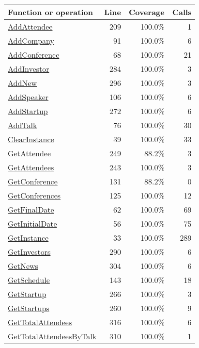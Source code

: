 \begin{longtable}{|l|r|r|r|}
\hline
Function or operation & Line & Coverage & Calls \\
\hline
\hline
\hyperref[AddAttendee:209]{AddAttendee} & 209&100.0\% & 1 \\
\hline
\hyperref[AddCompany:91]{AddCompany} & 91&100.0\% & 6 \\
\hline
\hyperref[AddConference:68]{AddConference} & 68&100.0\% & 21 \\
\hline
\hyperref[AddInvestor:284]{AddInvestor} & 284&100.0\% & 3 \\
\hline
\hyperref[AddNew:296]{AddNew} & 296&100.0\% & 3 \\
\hline
\hyperref[AddSpeaker:106]{AddSpeaker} & 106&100.0\% & 6 \\
\hline
\hyperref[AddStartup:272]{AddStartup} & 272&100.0\% & 6 \\
\hline
\hyperref[AddTalk:76]{AddTalk} & 76&100.0\% & 30 \\
\hline
\hyperref[ClearInstance:39]{ClearInstance} & 39&100.0\% & 33 \\
\hline
\hyperref[GetAttendee:249]{GetAttendee} & 249&88.2\% & 3 \\
\hline
\hyperref[GetAttendees:243]{GetAttendees} & 243&100.0\% & 3 \\
\hline
\hyperref[GetConference:131]{GetConference} & 131&88.2\% & 0 \\
\hline
\hyperref[GetConferences:125]{GetConferences} & 125&100.0\% & 12 \\
\hline
\hyperref[GetFinalDate:62]{GetFinalDate} & 62&100.0\% & 69 \\
\hline
\hyperref[GetInitialDate:56]{GetInitialDate} & 56&100.0\% & 75 \\
\hline
\hyperref[GetInstance:33]{GetInstance} & 33&100.0\% & 289 \\
\hline
\hyperref[GetInvestors:290]{GetInvestors} & 290&100.0\% & 6 \\
\hline
\hyperref[GetNews:304]{GetNews} & 304&100.0\% & 6 \\
\hline
\hyperref[GetSchedule:143]{GetSchedule} & 143&100.0\% & 18 \\
\hline
\hyperref[GetStartup:266]{GetStartup} & 266&100.0\% & 3 \\
\hline
\hyperref[GetStartups:260]{GetStartups} & 260&100.0\% & 9 \\
\hline
\hyperref[GetTotalAttendees:316]{GetTotalAttendees} & 316&100.0\% & 6 \\
\hline
\hyperref[GetTotalAttendeesByTalk:310]{GetTotalAttendeesByTalk} & 310&100.0\% & 1 \\

\end{longtable}
